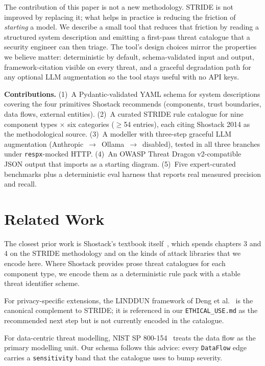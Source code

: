 \documentclass[conference]{IEEEtran}
\begin{document}
The contribution of this paper is not a new methodology. STRIDE is
not improved by replacing it; what helps in practice is reducing the
friction of \emph{starting} a model. We describe a small tool that
reduces that friction by reading a structured system description and
emitting a first-pass threat catalogue that a security engineer can
then triage. The tool's design choices mirror the properties we
believe matter: deterministic by default, schema-validated input and
output, framework-citation visible on every threat, and a graceful
degradation path for any optional LLM augmentation so the tool stays
useful with no API keys.

\textbf{Contributions.} (1)~A Pydantic-validated YAML schema for
system descriptions covering the four primitives Shostack
recommends (components, trust boundaries, data flows, external
entities). (2)~A curated STRIDE rule catalogue for nine component
types $\times$ six categories ($\geq$54 entries), each citing
Shostack 2014 as the methodological source. (3)~A modeller with
three-step graceful LLM augmentation
(Anthropic~$\rightarrow$~Ollama~$\rightarrow$~disabled), tested in
all three branches under \texttt{respx}-mocked HTTP. (4)~An OWASP
Threat Dragon v2-compatible JSON output that imports as a starting
diagram. (5)~Five expert-curated benchmarks plus a deterministic
eval harness that reports real measured precision and recall.

\section{Related Work}

The closest prior work is Shostack's textbook
itself~\cite{shostack2014threat}, which spends chapters 3 and 4 on
the STRIDE methodology and on the kinds of attack libraries that we
encode here. Where Shostack provides prose threat catalogues for
each component type, we encode them as a deterministic rule pack
with a stable threat identifier scheme.

For privacy-specific extensions, the LINDDUN framework of
Deng et al.~\cite{deng2011linddun} is the canonical complement to
STRIDE; it is referenced in our \texttt{ETHICAL\_USE.md} as the
recommended next step but is not currently encoded in the
catalogue.

For data-centric threat modelling, NIST SP
800-154~\cite{souppaya2016threat} treats the data flow as the
primary modelling unit. Our schema follows this advice: every
\texttt{DataFlow} edge carries a \texttt{sensitivity} band that the
catalogue uses to bump severity.
\end{document}
